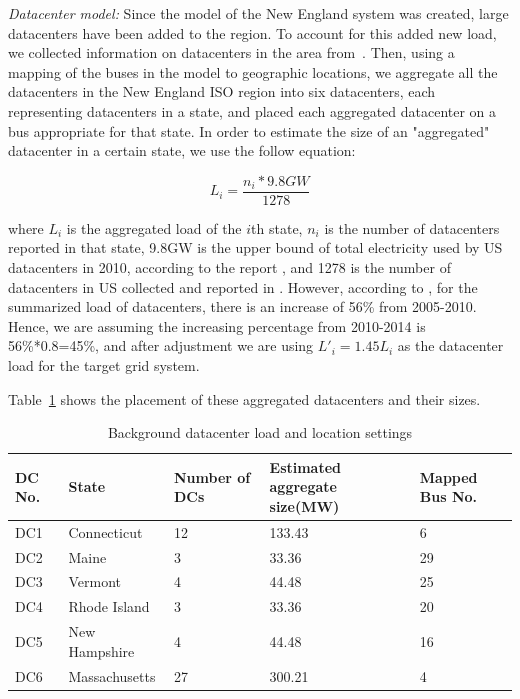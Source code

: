 {\em Datacenter model:} Since the model of the New England system was created, large datacenters have been added to the region.  To account for this added new load, we collected information on datacenters in the area from~\cite{DCmap}.  Then, using a mapping of the buses in the model to geographic locations, we aggregate all the datacenters in the New England ISO region into six datacenters, each representing datacenters in a state, and placed each aggregated datacenter on a bus appropriate for that state. In order to estimate the size of an "aggregated" datacenter in a certain state, we use the follow equation:

\begin{equation}
L_i=\frac{n_i*9.8GW}{1278}
\end{equation}

\noindent where $L_i$ is the aggregated load of the $i$th state, $n_i$ is the number of datacenters reported in that state,  9.8GW is the upper bound of total electricity used by US datacenters in 2010, according to the report \cite{Koomey2011}, and 1278 is the number of datacenters in US collected and reported in \cite{DCmap}. However, according to \cite{Koomey2011}, for the summarized load of datacenters, there is an increase of 56\% from 2005-2010. Hence, we are assuming the increasing percentage from 2010-2014 is 56\%*0.8=45\%, and after adjustment we are using $L'_i=1.45L_i$ as the datacenter load for the target grid system.

Table~\ref{tab:dc_setting} shows the placement of these aggregated datacenters and their sizes.

\begin{table}[ht]
\begin{center}
\caption{Background datacenter load and location settings}
\begin{tabular}{|l|l|p{30pt}|p{50pt}|p{30pt}|}
\hline
DC No. & State & Number of DCs & Estimated  aggregate size(MW) & Mapped Bus No.\\
\hline
DC1 & Connecticut & 12 &133.43 & 6\\
DC2 & Maine & 3 &33.36 & 29 \\
DC3 & Vermont & 4 &44.48 & 25 \\
DC4 & Rhode Island & 3 &33.36 & 20\\
DC5 & New Hampshire & 4& 44.48 & 16\\
DC6 & Massachusetts & 27& 300.21 & 4 \\
\hline

\end{tabular}
   \vspace{.05in}
\label{tab:dc_setting}
\end{center}
\end{table}


